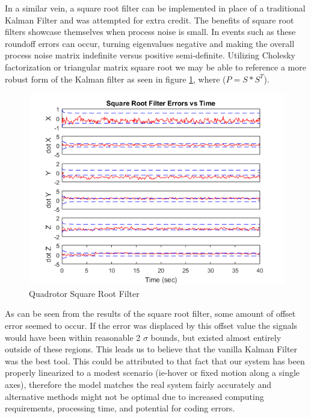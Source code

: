 \documentclass[12pt]{extarticle}
\begin{document}
{{In a similar vein, a square root filter can be implemented in place of a traditional Kalman Filter and was attempted for extra credit.  The benefits of square root filters showcase themselves when process noise is small.  In events such as these roundoff errors can occur, turning eigenvalues negative and making the overall process noise matrix indefinite versus positive semi-definite.  Utilizing Cholesky factorization or triangular matrix square root we may be able to reference a more robust form of the Kalman filter as seen in figure \ref{fig:SRKF}, where ($P=S*S^T$).

\begin{figure}[h!]
    \centering
    \includegraphics[width=\textwidth,clip=true,trim={0cm 0 0cm 0}]{Images/SRKF4.png}
    \caption{Quadrotor Square Root Filter}\label{fig:SRKF}
\end{figure}

As can be seen from the results of the square root filter, some amount of offset error seemed to occur. If the error was displaced by this offset value the signals would have been within reasonable 2 $\sigma$ bounds, but existed almost entirely outside of these regions. This leads us to believe that the vanilla Kalman Filter was the best tool. This could be attributed to that fact that our system has been properly linearized to a modest scenario (ie-hover or fixed motion along a single axes), therefore the model matches the real system fairly accurately and alternative methods might not be optimal due to increased computing requirements, processing time, and potential for coding errors.

}

}
\end{document}

